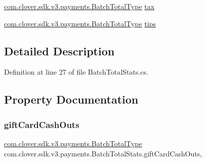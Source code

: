 \begin{DoxyCompactItemize}
\item 
\hyperlink{classcom_1_1clover_1_1sdk_1_1v3_1_1payments_1_1_batch_total_type}{com.\+clover.\+sdk.\+v3.\+payments.\+Batch\+Total\+Type} \hyperlink{classcom_1_1clover_1_1sdk_1_1v3_1_1payments_1_1_batch_total_stats_adcbff36c14e2508612798a87a9c16ac5}{tax}
\item 
\hyperlink{classcom_1_1clover_1_1sdk_1_1v3_1_1payments_1_1_batch_total_type}{com.\+clover.\+sdk.\+v3.\+payments.\+Batch\+Total\+Type} \hyperlink{classcom_1_1clover_1_1sdk_1_1v3_1_1payments_1_1_batch_total_stats_aa829bb717b68c7522b6a27941c224509}{tips}
\end{DoxyCompactItemize}


\subsection{Detailed Description}


Definition at line 27 of file Batch\+Total\+Stats.\+cs.



\subsection{Property Documentation}
\mbox{\label{classcom_1_1clover_1_1sdk_1_1v3_1_1payments_1_1_batch_total_stats_ae52561b0f81aeae3c505715ec32deedd}} 
\subsubsection{\texorpdfstring{gift\+Card\+Cash\+Outs}{giftCardCashOuts}}
{\footnotesize\ttfamily \hyperlink{classcom_1_1clover_1_1sdk_1_1v3_1_1payments_1_1_batch_total_type}{com.\+clover.\+sdk.\+v3.\+payments.\+Batch\+Total\+Type} com.\+clover.\+sdk.\+v3.\+payments.\+Batch\+Total\+Stats.\+gift\+Card\+Cash\+Outs\hspace{0.3cm}{\ttfamily [get]}, {\ttfamily [set]}}



